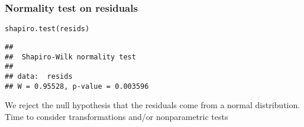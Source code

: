 \documentclass[color=usenames,dvipsnames]{beamer}\usepackage[]{graphicx}\usepackage[]{color}
\makeatletter
\newcommand{\hlstd}[1]{\textcolor[rgb]{0,0,0}{#1}}%
\newcommand{\hlkwd}[1]{\textcolor[rgb]{0.004,0.004,0.506}{#1}}%
\newenvironment{kframe}{%
 \def\at@end@of@kframe{}%
 \ifinner\ifhmode%
  \def\at@end@of@kframe{\end{minipage}}%
  \begin{minipage}{\columnwidth}%
 \fi\fi%
 \def\FrameCommand##1{\hskip\@totalleftmargin \hskip-\fboxsep
 \colorbox{shadecolor}{##1}\hskip-\fboxsep
     \hskip-\linewidth \hskip-\@totalleftmargin \hskip\columnwidth}%
 \MakeFramed {\advance\hsize-\width
   \@totalleftmargin\z@ \linewidth\hsize
   \@setminipage}}%
 {\par\unskip\endMakeFramed%
 \at@end@of@kframe}
\newenvironment{knitrout}{}{} %
\makeatother
\begin{document}
\begin{frame}[fragile]
  \frametitle{Normality test on residuals}
\begin{knitrout}
\color{fgcolor}\begin{kframe}
\begin{alltt}
\hlkwd{shapiro.test}\hlstd{(resids)}
\end{alltt}
\begin{verbatim}
## 
## 	Shapiro-Wilk normality test
## 
## data:  resids
## W = 0.95528, p-value = 0.003596
\end{verbatim}
\end{kframe}
\end{knitrout}
\pause
\vspace{0.6cm}
{We reject the null hypothesis that the residuals come from a normal
  distribution. Time to consider transformations and/or nonparametric
  tests}
\end{frame}












\end{document}
